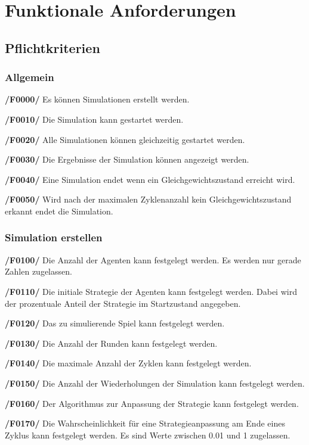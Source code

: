 \section{Funktionale Anforderungen}

\subsection{Pflichtkriterien}

\subsubsection{Allgemein}

\textbf{/F0000/}
Es können Simulationen erstellt werden.

\textbf{/F0010/} 
Die Simulation kann gestartet werden.

\textbf{/F0020/}
Alle Simulationen können gleichzeitig gestartet werden.

\textbf{/F0030/} 
Die Ergebnisse der Simulation können angezeigt werden.

\textbf{/F0040/}
Eine Simulation endet wenn ein Gleichgewichtszustand erreicht wird.

\textbf{/F0050/}
Wird nach der maximalen Zyklenanzahl kein Gleichgewichtszustand erkannt endet die Simulation.

\subsubsection{Simulation erstellen}

\textbf{/F0100/} 
Die Anzahl der Agenten kann festgelegt werden. Es werden nur gerade Zahlen zugelassen.

\textbf{/F0110/} 
Die initiale Strategie der Agenten kann festgelegt werden. Dabei wird der prozentuale Anteil der Strategie im Startzustand angegeben.  

\textbf{/F0120/} 
Das zu simulierende Spiel kann festgelegt werden.

\textbf{/F0130/} 
Die Anzahl der Runden kann festgelegt werden.

\textbf{/F0140/} 
Die maximale Anzahl der Zyklen kann festgelegt werden.

\textbf{/F0150/} 
Die Anzahl der Wiederholungen der Simulation kann festgelegt werden.

\textbf{/F0160/} 
Der Algorithmus zur Anpassung der Strategie kann festgelegt werden.

\textbf{/F0170/} 
Die Wahrscheinlichkeit für eine Strategieanpassung am Ende eines Zyklus kann festgelegt werden. Es sind Werte zwischen 0.01 und 1 zugelassen.

